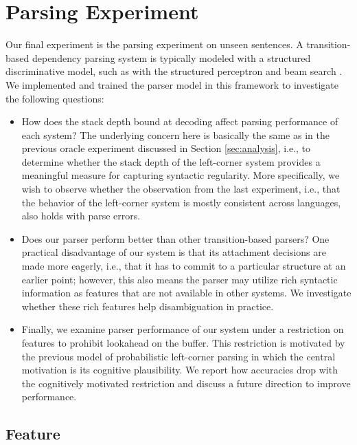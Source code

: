 \documentclass[english]{jnlp_1.4}
\begin{document}
\section{Parsing Experiment}
\label{sec:parse}

Our final experiment is the parsing experiment on unseen sentences.
A transition-based dependency parsing system is typically modeled with a structured discriminative model, such as with the structured perceptron and beam search \cite{zhang-clark:2008:EMNLP,huang-sagae:2010:ACL}.
We implemented and trained the parser model in this framework to investigate the following questions:
\begin{itemize}
 \item How does the stack depth bound at decoding affect parsing performance of each system?
       The underlying concern here is basically the same as in the previous oracle experiment discussed in Section \ref{sec:analysis}, i.e., to determine whether the stack depth of the left-corner system provides a meaningful measure for capturing syntactic regularity.
       More specifically, we wish to observe whether the observation from the last experiment, i.e., that the behavior of the left-corner system is mostly consistent across languages, also holds with parse errors.
 \item Does our parser perform better than other transition-based parsers?
       One practical disadvantage of our system is that its attachment decisions are made more eagerly, i.e., that it has to commit to a particular structure at an earlier point;
       however, this also means the parser may utilize rich syntactic information as features that are not available in other systems.
       We investigate whether these rich features help disambiguation in practice.
 \item Finally, we examine parser performance of our system under a restriction on features to prohibit lookahead on the buffer.
       This restriction is motivated by the previous model of probabilistic left-corner parsing \cite{journals/coling/SchulerAMS10} in which the central motivation is its cognitive plausibility.
       We report how accuracies drop with the cognitively motivated restriction and discuss a future direction to improve performance.
\end{itemize}


\subsection{Feature}
\end{document}
